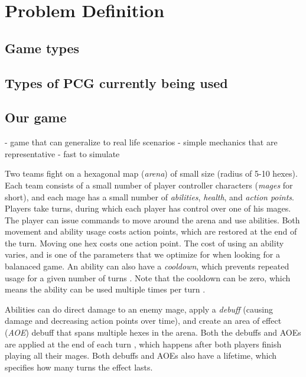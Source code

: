 \chapter{Problem Definition}

\section{Game types}

\section{Types of PCG currently being used}

\section{Our game}

- game that can generalize to real life scenarios
- simple mechanics that are representative
- fast to simulate

Two teams fight on a hexagonal map (\emph{arena}) of small size (radius of
5-10 hexes). Each team consists of a small number of player controller
characters (\emph{mages} for short), and each mage has a small number of
\emph{abilities}, \emph{health}, and \emph{action points}. Players take turns, during
which each player has control over one of his mages. The player can issue
commands to move around the arena and use abilities. Both movement and ability
usage costs action points, which are restored at the end of the turn.  Moving
one hex costs one action point. The cost of using an ability varies, and is one
of the parameters that we optimize for when looking for a balanaced game. An
ability can also have a \emph{cooldown}, which prevents repeated usage for a
given number of turns . Note that the cooldown can
be zero, which means the ability can be used multiple times per turn
.


Abilities can do direct damage to an enemy mage, apply a \emph{debuff} (causing
damage and decreasing action points over time), and create an area of effect
(\emph{AOE}) debuff that spans multiple hexes in the arena. Both the debuffs and
AOEs are applied at the end of each turn , which happens after both players finish playing all their mages.
Both debuffs and AOEs also have a lifetime, which specifies how many turns
 the effect lasts.
